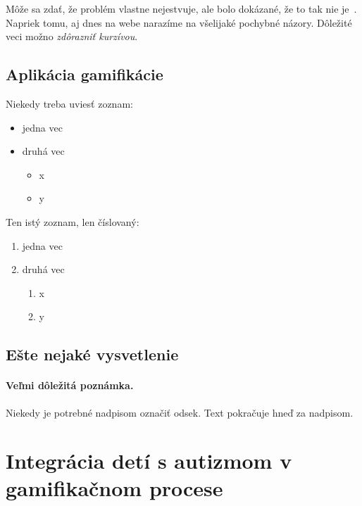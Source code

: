 \documentclass[10pt,twoside,slovak,a4paper]{coursepaper}
\begin{document}
Môže sa zdať, že problém vlastne nejestvuje\cite{Coplien:MPD}, ale bolo dokázané, že to tak nie je~\cite{Czarnecki:Staged, Czarnecki:Progress}. Napriek tomu, aj dnes na webe narazíme na všelijaké pochybné názory\cite{PLP-Framework}. Dôležité veci možno \emph{zdôrazniť kurzívou}.


\subsection{Aplikácia gamifikácie} \label{Aplikácie gamifikácie}

Niekedy treba uviesť zoznam:

\begin{itemize}
\item jedna vec
\item druhá vec
	\begin{itemize}
	\item x
	\item y
	\end{itemize}
\end{itemize}

Ten istý zoznam, len číslovaný:

\begin{enumerate}
\item jedna vec
\item druhá vec
	\begin{enumerate}
	\item x
	\item y
	\end{enumerate}
\end{enumerate}


\subsection{Ešte nejaké vysvetlenie} \label{ina:este}

\paragraph{Veľmi dôležitá poznámka.}
Niekedy je potrebné nadpisom označiť odsek. Text pokračuje hneď za nadpisom.



\section{Integrácia detí s autizmom v gamifikačnom procese} \label{Integrácia detí s autizmom v gamifikačnom procese}
\end{document}
